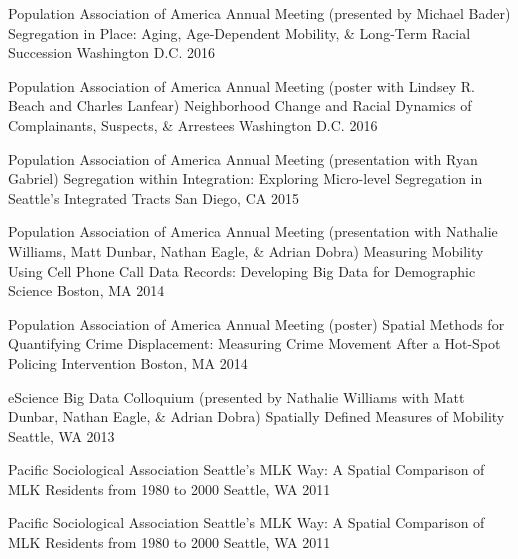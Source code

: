 \begin{cventries}
  \cventry
    {Population Association of America Annual Meeting (presented by Michael Bader)} %
    {Segregation in Place: Aging, Age-Dependent Mobility, \& Long-Term Racial Succession} %
    {Washington D.C.} %
    {2016} %
    {}

  \cventry
    {Population Association of America Annual Meeting (poster with Lindsey R. Beach and Charles Lanfear)} %
    {Neighborhood Change and Racial Dynamics of Complainants, Suspects, \& Arrestees} %
    {Washington D.C.} %
    {2016} %
    {}

  \cventry
    {Population Association of America Annual Meeting (presentation with Ryan Gabriel)} %
    {Segregation within Integration: Exploring Micro-level Segregation in Seattle's Integrated Tracts} %
    {San Diego, CA} %
    {2015} %
    {}

  \cventry
    {Population Association of America Annual Meeting (presentation with Nathalie Williams, Matt Dunbar, Nathan Eagle, \& Adrian Dobra)} %
    {Measuring Mobility Using Cell Phone Call Data Records: Developing Big Data for Demographic Science} %
    {Boston, MA} %
    {2014} %
    {}

  \cventry
    {Population Association of America Annual Meeting (poster)} %
    {Spatial Methods for Quantifying Crime Displacement: Measuring Crime Movement After a Hot-Spot Policing Intervention} %
    {Boston, MA} %
    {2014} %
    {}

  \cventry
    {eScience Big Data Colloquium (presented by Nathalie Williams with Matt Dunbar, Nathan Eagle, \& Adrian Dobra)} %
    {Spatially Defined Measures of Mobility} %
    {Seattle, WA} %
    {2013} %
    {}

  \cventry
    {Pacific Sociological Association} %
    {Seattle's MLK Way: A Spatial Comparison of MLK Residents from 1980 to 2000} %
    {Seattle, WA} %
    {2011} %
    {}

  \cventry
    {Pacific Sociological Association} %
    {Seattle's MLK Way: A Spatial Comparison of MLK Residents from 1980 to 2000} %
    {Seattle, WA} %
    {2011} %
    {}

\end{cventries}
